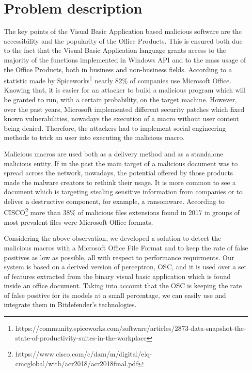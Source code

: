 \section{Problem description}

The key points of the Visual Basic Application based malicious software are the accessibility and the popularity of the Office Products. This is ensured both due to the fact that the Visual Basic Application language grants access to the majority of the functions implemented in Windows API and to the mass usage of the Office Products, both in business and non-business fields. According to a statistic made by Spiceworks\footnote{https://community.spiceworks.com/software/articles/2873-data-snapshot-the-state-of-productivity-suites-in-the-workplace} nearly 82\% of companies use Microsoft Office. Knowing that, it is easier for an attacker to build a malicious program which will be granted to run, with a certain probability, on the target machine. However, over the past years, Microsoft implemented different security patches which fixed known vulnerabilities, nowadays the execution of a macro without user content being denied. Therefore, the attackers had to implement social engineering methods to trick an user into executing the malicious macro.
\par
Malicious macros are used both as a delivery method and as a standalone malicious entity. If in the past the main target of a malicious document was to spread across the network, nowadays, the potential offered by those products made the malware creators to rethink their usage. It is more common to see a document which is targeting stealing sensitive information from companies or to deliver a destructive component, for example, a ransomware. According to CISCO\footnote{https://www.cisco.com/c/dam/m/digital/elq-cmcglobal/witb/acr2018/acr2018final.pdf} more than 38\% of malicious files extensions found in 2017 in groups of most prevalent files were Microsoft Office formats.
\par
Considering the above observation, we developed a solution to detect the malicious macros with a Microsoft Office File Format and to keep the rate of false positives as low as possible, all with respect to performance requirments. Our system is based on a derived version of perceptron, OSC\cite{OSC}, and it is used over a set of features extracted from the binary visual basic application which is found inside an office document. Taking into account that the OSC is keeping the rate of false positive for its models at a small percentage, we can easily use and integrate them in Bitdefender's technologies.
